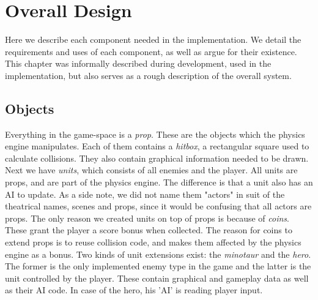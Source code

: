 \chapter{Overall Design} %
Here we describe each component needed in the implementation. We detail the requirements and uses of each component, as well as argue for their existence. This chapter was informally described during development, used in the implementation, but also serves as a rough description of the overall system.

\section{Objects} %
Everything in the game-space is a \emph{prop}. These are the objects which the physics engine manipulates. Each of them contains a \emph{hitbox}, a rectangular square used to calculate collisions. They also contain graphical information needed to be drawn.
\newline
Next we have \emph{units}, which consists of all enemies and the player. All units are props, and are part of the physics engine. The difference is that a unit also has an AI to update. As a side note, we did not name them "actors" in suit of the theatrical names, scenes and props, since it would be confusing that all actors are props.
\newline
The only reason we created units on top of props is because of \emph{coins}. These grant the player a score bonus when collected. The reason for coins to extend props is to reuse collision code, and makes them affected by the physics engine as a bonus.
\newline
Two kinds of unit extensions exist: the \emph{minotaur} and the \emph{hero}. The former is the only implemented enemy type in the game and the latter is the unit controlled by the player. These contain graphical and gameplay data as well as their AI code. In case of the hero, his 'AI' is reading player input.

